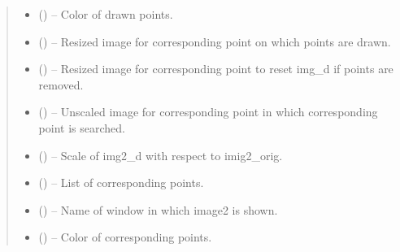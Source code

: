 \documentclass[letterpaper,10pt,english]{sphinxmanual}
\begin{document}
\begin{fulllineitems}
\begin{quote}
\begin{description}
\begin{itemize}
\item {} 
 () -- Color of drawn points.

\item {} 
 () -- Resized image for corresponding point on which points are drawn.

\item {} 
 () -- Resized image for corresponding point to reset img\_d if points
are removed.

\item {} 
 () -- Unscaled image for corresponding point in which corresponding
point is searched.

\item {} 
 () -- Scale of img2\_d with respect to imig2\_orig.

\item {} 
 () -- List of corresponding points.

\item {} 
 () -- Name of window in which image2 is shown.

\item {} 
 () -- Color of corresponding points.

\end{itemize}

\end{description}\end{quote}

\end{fulllineitems}

\end{document}

